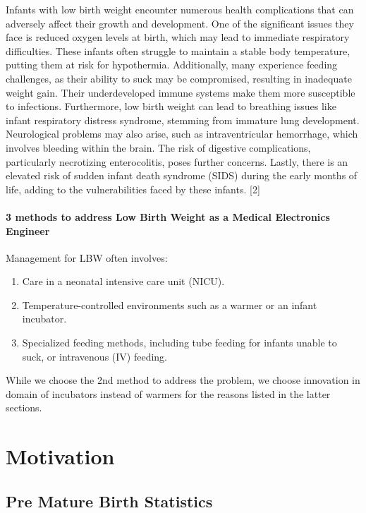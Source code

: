 \documentclass{article}
\begin{document}
Infants with low birth weight encounter numerous health complications
that can adversely affect their growth and development. One of the
significant issues they face is reduced oxygen levels at birth, which
may lead to immediate respiratory difficulties. These infants often
struggle to maintain a stable body temperature, putting them at risk for
hypothermia. Additionally, many experience feeding challenges, as their
ability to suck may be compromised, resulting in inadequate weight gain.
Their underdeveloped immune systems make them more susceptible to
infections. Furthermore, low birth weight can lead to breathing issues
like infant respiratory distress syndrome, stemming from immature lung
development. Neurological problems may also arise, such as
intraventricular hemorrhage, which involves bleeding within the brain.
The risk of digestive complications, particularly necrotizing
enterocolitis, poses further concerns. Lastly, there is an elevated risk
of sudden infant death syndrome (SIDS) during the early months of life,
adding to the vulnerabilities faced by these infants. {[}2{]}

\paragraph{3 methods to address Low Birth Weight as a Medical
Electronics
Engineer}\label{methods-to-address-low-birth-weight-as-a-medical-electronics-engineer}

Management for LBW often involves:

\begin{enumerate}
\def\labelenumi{\arabic{enumi}.}
\item
  Care in a neonatal intensive care unit (NICU).
\item
  Temperature-controlled environments such as a warmer or an infant
  incubator.
\item
  Specialized feeding methods, including tube feeding for infants unable
  to suck, or intravenous (IV) feeding.
\end{enumerate}

While we choose the 2nd method to address the problem, we choose
innovation in domain of incubators instead of warmers for the reasons
listed in the latter sections.

\section{Motivation}\label{motivation}

\subsection{Pre Mature Birth
Statistics}\label{pre-mature-birth-statistics}
\end{document}
